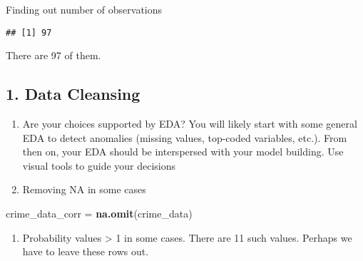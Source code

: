 \documentclass[]{article}
\newenvironment{Shaded}{\begin{snugshade}}{\end{snugshade}}
\newcommand{\KeywordTok}[1]{\textcolor[rgb]{0.13,0.29,0.53}{\textbf{#1}}}
\newcommand{\DecValTok}[1]{\textcolor[rgb]{0.00,0.00,0.81}{#1}}
\newcommand{\StringTok}[1]{\textcolor[rgb]{0.31,0.60,0.02}{#1}}
\newcommand{\OperatorTok}[1]{\textcolor[rgb]{0.81,0.36,0.00}{\textbf{#1}}}
\newcommand{\NormalTok}[1]{#1}
\providecommand{\tightlist}{%
  \setlength{\itemsep}{0pt}\setlength{\parskip}{0pt}}
\begin{document}
Finding out number of observations

\begin{Shaded}
\end{Shaded}

\begin{verbatim}
## [1] 97
\end{verbatim}

There are 97 of them.

\subsection{1. Data Cleansing}\label{data-cleansing}

\begin{enumerate}
\def\labelenumi{\arabic{enumi}.}
\setcounter{enumi}{2}
\item
  Are your choices supported by EDA? You will likely start with some
  general EDA to detect anomalies (missing values, top-coded variables,
  etc.). From then on, your EDA should be interspersed with your model
  building. Use visual tools to guide your decisions
\item
  Removing NA in some cases
\end{enumerate}

\begin{Shaded}
\begin{Highlighting}[]
\NormalTok{crime_data_corr =}\StringTok{ }\KeywordTok{na.omit}\NormalTok{(crime_data)}
\end{Highlighting}
\end{Shaded}

\begin{enumerate}
\def\labelenumi{\arabic{enumi}.}
\setcounter{enumi}{1}
\tightlist
\item
  Probability values \textgreater{} 1 in some cases. There are 11 such
  values. Perhaps we have to leave these rows out.
\end{enumerate}

\begin{Shaded}
\end{Shaded}
\end{document}
